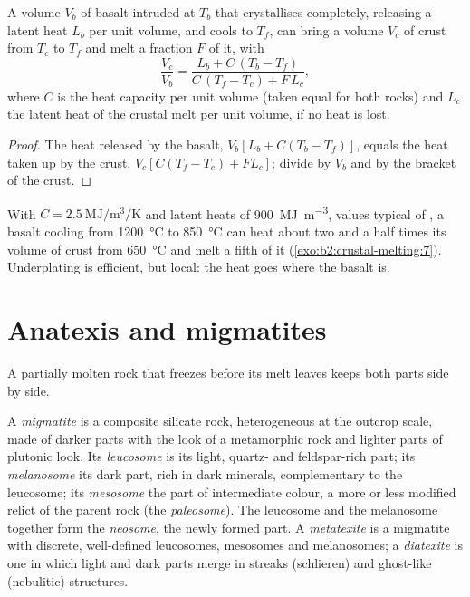 \begin{proposition}\label{prop:b2:crustal-melting:heat}
A volume $V_b$ of basalt intruded at $T_b$ that crystallises completely, releasing a
latent heat $L_b$ per unit volume, and cools to $T_f$, can bring a volume $V_c$ of crust
from $T_c$ to $T_f$ and melt a fraction $F$ of it, with
\[\frac{V_c}{V_b} = \frac{L_b + C\,(T_b - T_f)}{C\,(T_f - T_c) + F\,L_c},\]
where $C$ is the heat capacity per unit volume (taken equal for both rocks) and $L_c$ the
latent heat of the crustal melt per unit volume, if no heat is lost.
\end{proposition}

\begin{proof}
The heat released by the basalt, $V_b[L_b + C(T_b - T_f)]$, equals the heat taken up by
the crust, $V_c[C(T_f - T_c) + F L_c]$; divide by $V_b$ and by the bracket of the crust.
\end{proof}

With $C = \qty{2.5}{\mega\joule\per\cubic\metre\per\kelvin}$ and latent heats of
\qty{900}{\mega\joule\per\cubic\metre}, values typical of , a basalt cooling from
\qty{1200}{\celsius} to \qty{850}{\celsius} can heat about two and a half times its volume
of crust from \qty{650}{\celsius} and melt a fifth of it (\cref{exo:b2:crustal-melting:7}).
Underplating is efficient, but local: the heat goes where the basalt is.

\section{Anatexis and migmatites}\label{sec:b2:crustal-melting:migmatites}

A partially molten rock that freezes before its melt leaves keeps both parts side by side.

\begin{definition}\label{def:b2:crustal-melting:migmatite}
A \emph{migmatite} is a composite silicate rock, heterogeneous at the
outcrop scale, made of darker parts with the look of a metamorphic rock and lighter parts
of plutonic look. Its \emph{leucosome} is its light, quartz- and
feldspar-rich part; its \emph{melanosome} its dark part, rich in dark
minerals, complementary to the leucosome; its \emph{mesosome} the part of intermediate
colour, a more or less modified relict of the parent rock (the \emph{paleosome}). The
leucosome and the melanosome together form the \emph{neosome}, the newly formed part. A
\emph{metatexite} is a migmatite with discrete, well-defined leucosomes,
mesosomes and melanosomes; a \emph{diatexite} is one in which light and
dark parts merge in streaks (schlieren) and ghost-like (nebulitic) structures.
\end{definition}

